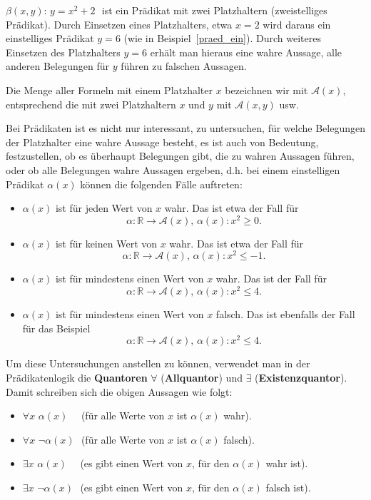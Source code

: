 \begin{beispiel}\label{praed_zwe} $\beta(x,y) : \, y = x^2 + 2 \,\,$ ist ein Prädikat mit zwei Platzhaltern 
(zweistelliges Prädikat). Durch Einsetzen eines Platzhalters, etwa $x = 2$ wird daraus ein einstelliges 
Prädikat $y = 6$ (wie in Beispiel~\ref{praed_ein}). Durch weiteres Einsetzen des Platzhalters $y = 6$ erhält man 
hieraus eine wahre Aussage, alle anderen Belegungen für $y$ führen zu falschen Aussagen.
\end{beispiel}

Die Menge aller Formeln mit einem Platzhalter $x$ bezeichnen wir mit $\mathcal{A}(x)$, entsprechend die 
mit zwei Platzhaltern $x$ und $y$ mit $\mathcal{A}(x,y)$ usw.

Bei Prädikaten ist es nicht nur interessant, zu untersuchen, für welche Belegungen der Platzhalter eine wahre 
Aussage besteht, es ist auch von Bedeutung, festzustellen, ob es überhaupt Belegungen gibt, die zu wahren 
Aussagen führen, oder ob alle Belegungen wahre Aussagen ergeben, d.h. bei einem einstelligen Prädikat $\alpha(x)$ 
können die folgenden Fälle auftreten:
\begin{itemize}
\item $\alpha(x)$ ist für jeden Wert von $x$ wahr. Das ist etwa der Fall für 
  	$$\alpha: \mathbb R \longrightarrow  \mathcal{A}(x),\,  \alpha(x) : x^2 \geq 0.$$
\item $\alpha(x)$ ist für keinen Wert von $x$ wahr. Das ist etwa der Fall für 
  	$$ \alpha: \mathbb R \longrightarrow \mathcal{A}(x),\,  \alpha(x) : x^2 \leq -1.$$
\item $\alpha(x)$ ist für mindestens einen Wert von $x$ wahr. Das ist der Fall für 
  	$$ \alpha: \mathbb R  \longrightarrow \mathcal{A}(x),\,  \alpha(x) : x^2 \leq 4.$$
\item $\alpha(x)$ ist für mindestens einen Wert von $x$ falsch. Das ist ebenfalls der Fall für 
das Beispiel
  	$$ \alpha: \mathbb R  \longrightarrow \mathcal{A}(x),\,  \alpha(x) : x^2 \leq 4.$$
\end{itemize}
 Um diese Untersuchungen anstellen zu können, verwendet man in der Prädikatenlogik die 
\textbf{Quantoren} $\forall$ (\textbf{Allquantor}) 
und $\exists$ (\textbf{Existenzquantor}). Damit schreiben sich die 
obigen Aussagen wie folgt:
\begin{itemize}
\item $\forall x \,\, \alpha(x) \quad$ (für alle Werte von $x$ ist $\alpha(x)$ wahr).
\item $\forall x \,\, \neg \alpha(x) \,\,$ (für alle Werte von $x$ ist $\alpha(x)$ falsch).
\item $\exists x \,\, \alpha(x) \quad$ (es gibt einen Wert von $x$, für den $\alpha(x)$ wahr ist).
\item $\exists x \,\, \neg \alpha(x)\,\,$ (es gibt einen Wert von $x$, für den $\alpha(x)$ falsch ist).
\end{itemize}

